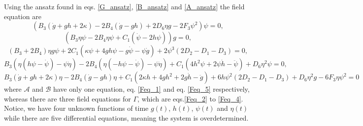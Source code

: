 \documentclass{article}
\begin{document}
Using the ansatz found in eqs. \eqref{G_ansatz}, \eqref{B_ansatz} and \eqref{A_ansatz} the field equation are
\begin{dmath}
    \label{Feq_1}
    \left(B_3\left(\dot{g} + gh + 2\kappa\right) - 2B_4\left(\dot{g} - gh\right) + 2D_6\eta g - 2F_3\psi^2\right)\psi = 0,
\end{dmath}
\begin{dmath}
    \label{Feq_2}
    \left(B_3\eta\psi -2B_4\eta\psi + C_1\left(\dot{\psi} - 2h\psi\right)\right)g = 0,
\end{dmath}
\begin{dmath}
    \label{Feq_3}
    \left(B_3 + 2B_4\right)\eta g\psi + 2C_1\left(\kappa\psi + 4gh\psi - g\dot{\psi} - \psi\dot{g}\right) + 2\psi^3\left(2D_2 - D_1 - D_3\right) = 0,
\end{dmath}
\begin{dmath}
    \label{Feq_4}
    B_3\left(\eta\left(h\psi - \dot{\psi}\right) -\psi\dot{\eta}\right) - 2B_4\left(\eta\left(-h\psi - \dot{\psi}\right) -\psi\dot{\eta}\right) 
    + C_1\left(4h^2\psi + 2\psi\dot{h} -\ddot{\psi}\right) + D_6\eta^2\psi = 0,
\end{dmath}
\begin{dmath}
    \label{Feq_5}
    B_3\left(\dot{g} + gh + 2\kappa\right)\eta - 2B_4\left(\dot{g} - gh\right)\eta + C_1\left(2\kappa h + 4gh^2 + 2g\dot{h} - \ddot{g}\right) +
    6h\psi^2\left(2D_2 - D_1 - D_3\right) + D_6 \eta^2 g - 6F_3\eta\psi^2 = 0
\end{dmath}
where $\mathcal{A}$ and $\mathcal{B}$ have only one equation, eq. \eqref{Feq_1} and eq. \eqref{Feq_5} respectively, 
whereas there are three field equations for $\Gamma$, which are eqs.\eqref{Feq_2} to \eqref{Feq_4}. Notice, we have four unknown functions 
of time $g(t)$, $h(t)$, $\psi(t)$ and $\eta(t)$ while there are five differential equations, meaning the system is overdetermined.
\end{document}
